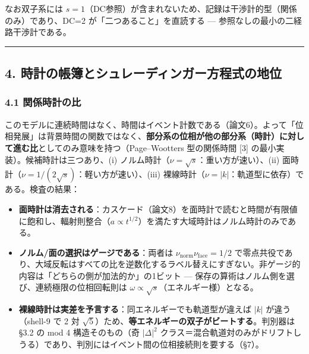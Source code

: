 \documentclass[
]{ltjsarticle}
\providecommand{\tightlist}{%
  \setlength{\itemsep}{0pt}\setlength{\parskip}{0pt}}
\begin{document}
なお双子系には
\(s=1\)（DC参照）が含まれないため、記録は干渉計的型（関係のみ）であり、DC=2
が「二つあること」を直読する --- 参照なしの最小の二経路干渉計である。

\begin{center}\rule{0.5\linewidth}{0.5pt}\end{center}

\subsection{4.
時計の帳簿とシュレーディンガー方程式の地位}\label{ux6642ux8a08ux306eux5e33ux7c3fux3068ux30b7ux30e5ux30ecux30fcux30c7ux30a3ux30f3ux30acux30fcux65b9ux7a0bux5f0fux306eux5730ux4f4d}

\subsubsection{4.1
関係時計の比}\label{ux95a2ux4fc2ux6642ux8a08ux306eux6bd4}

このモデルに連続時間はなく、時間はイベント計数である（論文6）。よって「位相発展」は背景時間の関数ではなく、\textbf{部分系の位相が他の部分系（時計）に対して進む比}としてのみ意味を持つ（Page--Wootters
型の関係時間 {[}3{]} の最小実装）。候補時計は三つあり、(i)
ノルム時計（\(\nu=\sqrt s\)：重い方が速い）、(ii)
面時計（\(\nu=1/(2\sqrt s)\)：軽い方が速い）、(iii)
裸線時計（\(\nu=|k|\)：軌道型に依存）である。検査の結果：

\begin{itemize}
\tightlist
\item
  \textbf{面時計は消去される}：カスケード（論文8）を面時計で読むと時間が有限値に飽和し、輻射則整合（\(a\propto t^{1/2}\)）を満たす大域時計はノルム時計のみである。
\item
  \textbf{ノルム/面の選択はゲージである}：両者は
  \(\nu_{\mathrm{norm}}\nu_{\mathrm{face}}=1/2\)
  で零点共役であり、大域反転はすべての比を逆数化するラベル替えにすぎない。非ゲージ的内容は「どちらの側が加法的か」の1ビット
  --- 保存の算術はノルム側を選び、連続極限の位相回転則は
  \(\omega\propto\sqrt s\)（エネルギー様）となる。
\item
  \textbf{裸線時計は実差を予言する}：同エネルギーでも軌道型が違えば
  \(|k|\) が違う（shell-9 で 2 対
  \(\sqrt5\)）ため、\textbf{等エネルギーの双子がビートする}。判別器は
  §3.2 の mod 4 構造そのもの（奇 \(|\Delta|^2\)
  クラス＝混合軌道対のみがドリフトしうる）であり、判別にはイベント間の位相接続則を要する（§7）。
\end{itemize}
\end{document}
